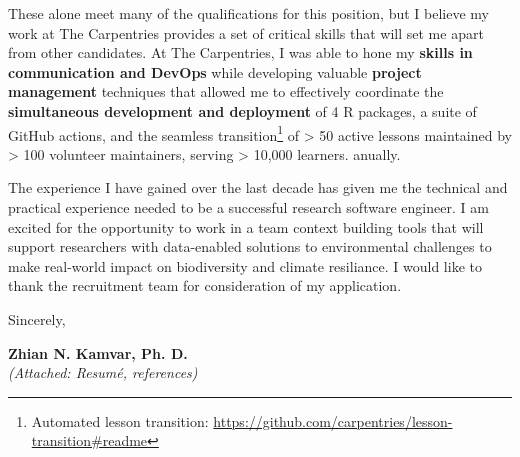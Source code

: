\vspace{2ex}

These alone meet many of the qualifications for this position, but I believe my
work at The Carpentries provides a set of critical skills that will set me
apart from other candidates. At The Carpentries, I was able to hone my
\textbf{skills in communication and DevOps} while developing valuable
\textbf{project management} techniques that allowed me to effectively
coordinate the \textbf{simultaneous development and deployment} of 4 R
packages, a suite of GitHub actions, and the seamless transition\footnote{Automated lesson transition: \url{https://github.com/carpentries/lesson-transition\#readme}}
of > 50 active lessons maintained by > 100 volunteer maintainers, serving >
10,000 learners. anually. 

\vspace{2ex}


The experience I have gained over the last decade has given me the technical and
practical experience needed to be a successful research software engineer. I am
excited for the opportunity to work in a team context building tools that will
support researchers with data-enabled solutions to environmental challenges to
make real-world impact on biodiversity and climate resiliance. I would like to
thank the recruitment team for consideration of my application.

\vspace{3ex}

Sincerely,

\vspace{4ex}

\textbf{Zhian N. Kamvar, Ph. D.}\\
{\footnotesize \textit{(Attached: Resum\'{e}, references)}}

\clearpage



